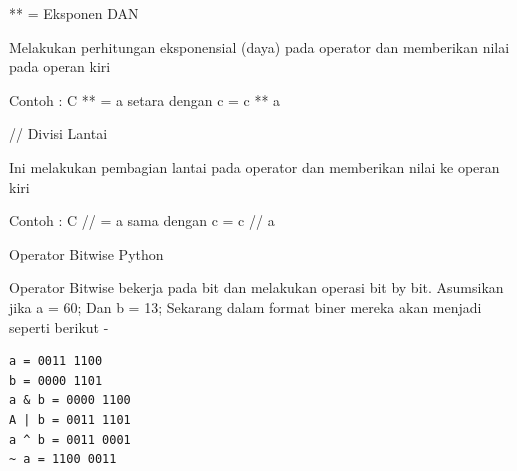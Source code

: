 \noindent
\vspace{12pt}
\noindent
** = Eksponen DAN \par
\noindent
Melakukan perhitungan eksponensial (daya) pada operator dan memberikan nilai pada operan kiri \par
\noindent
Contoh : C ** = a setara dengan c = c ** a \par
\noindent
\vspace{12pt}
\noindent
// Divisi Lantai \par
\noindent
Ini melakukan pembagian lantai pada operator dan memberikan nilai ke operan kiri \par
\noindent
Contoh : C // = a sama dengan c = c // a \par
\noindent
\vspace{12pt}
\noindent
Operator Bitwise Python \par
\vspace{12pt}
\noindent
Operator Bitwise bekerja pada bit dan melakukan operasi bit by bit. $  $Asumsikan jika a = 60; $  $Dan b = 13; $  $Sekarang dalam format biner mereka akan menjadi seperti berikut - \par

\begin{verbatim}
a = 0011 1100
b = 0000 1101
a & b = 0000 1100
A | b = 0011 1101
a ^ b = 0011 0001
~ a = 1100 0011
\end{verbatim}

